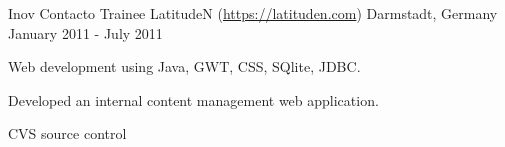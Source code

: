 \begin{cventries}
  \cventry
    {Inov Contacto Trainee } %
    {LatitudeN (\url{https://latituden.com}) } %
    {Darmstadt, Germany} %
    {January 2011 - July 2011} %
    {
	\begin{cvitems} %
      	\item {Web development using Java, GWT, CSS, SQlite, JDBC.}
		\item {Developed an internal content management web application.}
		\item {CVS source control\\\\}
	\end{cvitems}
}

\end{cventries}

